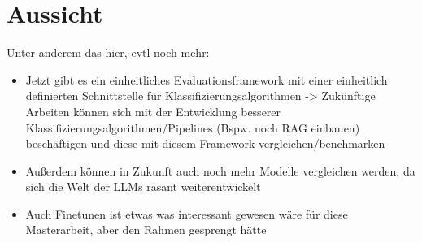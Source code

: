 \chapter{Aussicht}

Unter anderem das hier, evtl noch mehr:
\begin{itemize}
    \item Jetzt gibt es ein einheitliches Evaluationsframework mit einer einheitlich definierten Schnittstelle für Klassifizierungsalgorithmen -> Zukünftige Arbeiten können sich mit der Entwicklung besserer Klassifizierungsalgorithmen/Pipelines (Bspw. noch RAG einbauen) beschäftigen und diese mit diesem Framework vergleichen/benchmarken
    \item Außerdem können in Zukunft auch noch mehr Modelle vergleichen werden, da sich die Welt der LLMs rasant weiterentwickelt
    \item Auch Finetunen ist etwas was interessant gewesen wäre für diese Masterarbeit, aber den Rahmen gesprengt hätte
\end{itemize}